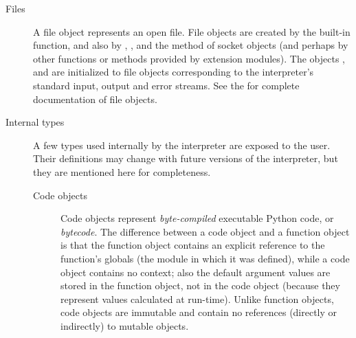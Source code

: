 \begin{description}
\item[Files]
A file object represents an open file.  File objects are
created by the  built-in function,
and also by
,
, and the
method of socket objects (and perhaps by other functions or methods
provided by extension modules).  The objects
,
 and
 are initialized to file objects
corresponding to the interpreter's standard input, output
and error streams.  See the  for complete documentation of file objects.


\item[Internal types]
A few types used internally by the interpreter are exposed to the user.
Their definitions may change with future versions of the interpreter,
but they are mentioned here for completeness.

\begin{description}

\item[Code objects]
Code objects represent \emph{byte-compiled} executable Python code, or 
\emph{bytecode}.
The difference between a code
object and a function object is that the function object contains an
explicit reference to the function's globals (the module in which it
was defined), while a code object contains no context; 
also the default argument values are stored in the function object,
not in the code object (because they represent values calculated at
run-time).  Unlike function objects, code objects are immutable and
contain no references (directly or indirectly) to mutable objects.


\end{description}
\end{description}
